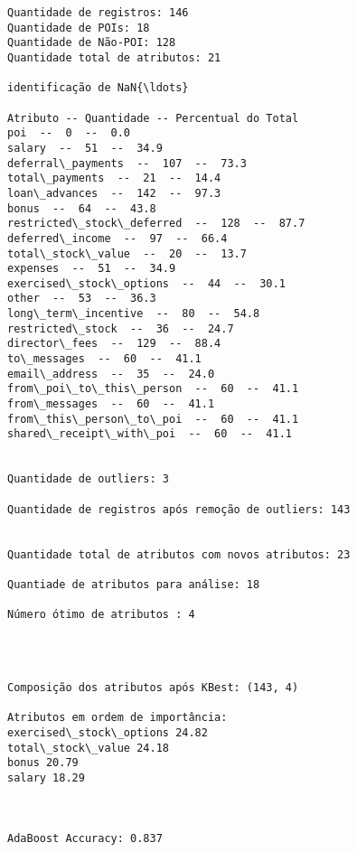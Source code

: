 \documentclass[11pt]{article}
\begin{document}
    \begin{Verbatim}[commandchars=\\\{\}]
Quantidade de registros: 146
Quantidade de POIs: 18
Quantidade de Não-POI: 128
Quantidade total de atributos: 21

identificação de NaN{\ldots}

Atributo -- Quantidade -- Percentual do Total
poi  --  0  --  0.0
salary  --  51  --  34.9
deferral\_payments  --  107  --  73.3
total\_payments  --  21  --  14.4
loan\_advances  --  142  --  97.3
bonus  --  64  --  43.8
restricted\_stock\_deferred  --  128  --  87.7
deferred\_income  --  97  --  66.4
total\_stock\_value  --  20  --  13.7
expenses  --  51  --  34.9
exercised\_stock\_options  --  44  --  30.1
other  --  53  --  36.3
long\_term\_incentive  --  80  --  54.8
restricted\_stock  --  36  --  24.7
director\_fees  --  129  --  88.4
to\_messages  --  60  --  41.1
email\_address  --  35  --  24.0
from\_poi\_to\_this\_person  --  60  --  41.1
from\_messages  --  60  --  41.1
from\_this\_person\_to\_poi  --  60  --  41.1
shared\_receipt\_with\_poi  --  60  --  41.1


Quantidade de outliers: 3

Quantidade de registros após remoção de outliers: 143


Quantidade total de atributos com novos atributos: 23

Quantiade de atributos para análise: 18

Número ótimo de atributos : 4

    \end{Verbatim}

    \begin{center}
    \end{center}
    { \hspace*{\fill} \\}
    
    \begin{Verbatim}[commandchars=\\\{\}]

Composição dos atributos após KBest: (143, 4)

Atributos em ordem de importância:
exercised\_stock\_options 24.82
total\_stock\_value 24.18
bonus 20.79
salary 18.29



AdaBoost Accuracy: 0.837

    \end{Verbatim}
\end{document}
